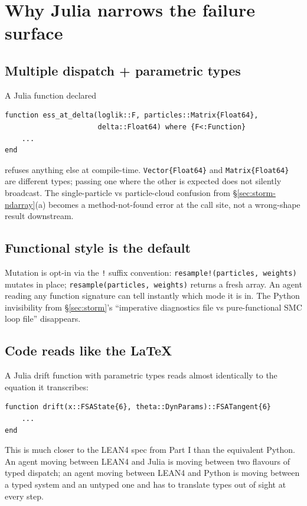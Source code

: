 \documentclass[11pt,a4paper]{article}
\begin{document}
\section{Why Julia narrows the failure surface}
\label{sec:why-julia}

\subsection{Multiple dispatch + parametric types}

A Julia function declared
\begin{lstlisting}
function ess_at_delta(loglik::F, particles::Matrix{Float64},
                      delta::Float64) where {F<:Function}
    ...
end
\end{lstlisting}
refuses anything else at compile-time. \texttt{Vector\{Float64\}}
and \texttt{Matrix\{Float64\}} are different types; passing one
where the other is expected does not silently broadcast. The
single-particle vs particle-cloud confusion from
§\ref{sec:storm-ndarray}(a) becomes a method-not-found error at the
call site, not a wrong-shape result downstream.

\subsection{Functional style is the default}

Mutation is opt-in via the \texttt{!} suffix convention:
\texttt{resample!(particles, weights)} mutates in place;
\texttt{resample(particles, weights)} returns a fresh array. An
agent reading any function signature can tell instantly which
mode it is in. The Python invisibility from §\ref{sec:storm}'s
``imperative diagnostics file vs pure-functional SMC loop file''
disappears.

\subsection{Code reads like the LaTeX}

A Julia drift function with parametric types reads almost
identically to the equation it transcribes:
\begin{lstlisting}
function drift(x::FSAState{6}, theta::DynParams)::FSATangent{6}
    ...
end
\end{lstlisting}
This is much closer to the LEAN4 spec from Part I than the
equivalent Python. An agent moving between LEAN4 and Julia is
moving between two flavours of typed dispatch; an agent moving
between LEAN4 and Python is moving between a typed system and an
untyped one and has to translate types out of sight at every step.
\end{document}
